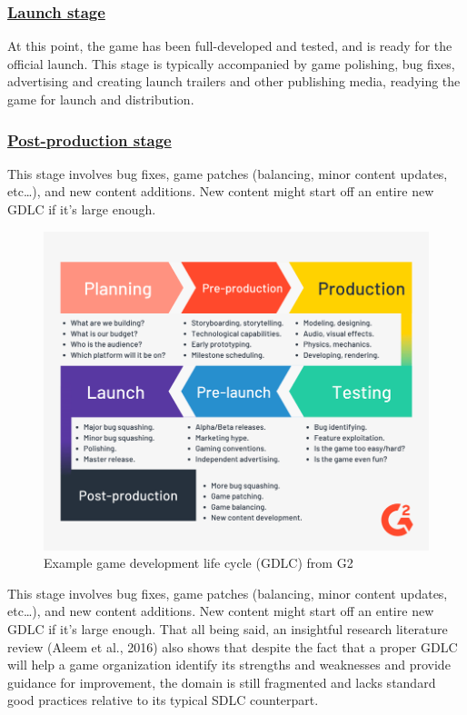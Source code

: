 \documentclass[../main.tex]{subfiles}
\begin{document}
\subsubsection*{\underline{Launch stage}}
At this point, the game has been full-developed and tested, and is ready for the official launch. This stage is typically accompanied by game polishing, bug fixes, advertising and creating launch trailers and other publishing media, readying the game for launch and distribution.

\subsubsection*{\underline{Post-production stage}}
This stage involves bug fixes, game patches (balancing, minor content updates, etc…), and new content additions. New content might start off an entire new GDLC if it's large enough.



\begin{figure}[!ht]
\centering
\includegraphics[scale=0.3]{images/chapter1/Example game development life cycle.png}
\caption{Example game development life cycle (GDLC) from G2}
\label{fig:Example game development life cycle (GDLC)}
\end{figure}
This stage involves bug fixes, game patches (balancing, minor content updates, etc…), and new content additions. New content might start off an entire new GDLC if it's large enough.
That all being said, an insightful research literature review (Aleem et al., 2016) \cite{11} also shows that despite the fact that a proper GDLC will help a game organization identify its strengths and weaknesses and provide guidance for improvement, the domain is still fragmented and lacks standard good practices relative to its typical SDLC counterpart. 
\newpage
\end{document}
